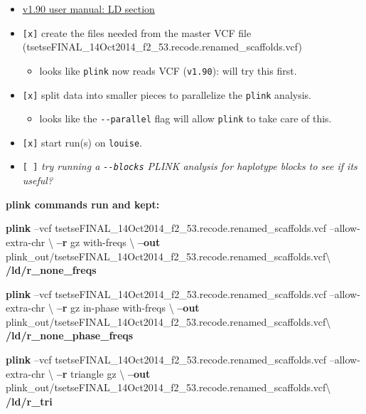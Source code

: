\documentclass[letterpaper]{scrartcl}
\newenvironment{Shaded}{}{}
\newcommand{\KeywordTok}[1]{\textcolor[rgb]{0.00,0.44,0.13}{\textbf{{#1}}}}
\newcommand{\NormalTok}[1]{{#1}}
\begin{document}
\begin{itemize}
\itemsep1pt\parskip0pt
\item
  \href{https://www.cog-genomics.org/plink2/ld}{v1.90 user manual: LD
  section}
\item
  \texttt{{[}x{]}} create the files needed from the master VCF file
  (tsetseFINAL\_14Oct2014\_f2\_53.recode.renamed\_scaffolds.vcf)

  \begin{itemize}
  \itemsep1pt\parskip0pt
  \item
    looks like \texttt{plink} now reads VCF (\texttt{v1.90}): will try
    this first.
  \end{itemize}
\item
  \texttt{{[}x{]}} split data into smaller pieces to parallelize the
  \texttt{plink} analysis.

  \begin{itemize}
  \itemsep1pt\parskip0pt
  \item
    looks like the \texttt{-\/-parallel} flag will allow \texttt{plink}
    to take care of this.
  \end{itemize}
\item
  \texttt{{[}x{]}} start run(s) on \texttt{louise}.
\item
  \texttt{{[} {]}} \emph{try running a \texttt{-\/-blocks} PLINK
  analysis for haplotype blocks to see if its useful?}
\end{itemize}

\textbf{plink commands run and kept:}

\begin{Shaded}
\begin{Highlighting}[]
\KeywordTok{plink} \NormalTok{--vcf tsetseFINAL_14Oct2014_f2_53.recode.renamed_scaffolds.vcf --allow-extra-chr \textbackslash{}}
    \KeywordTok{--r} \NormalTok{gz with-freqs  \textbackslash{}}
    \KeywordTok{--out} \NormalTok{plink_out/tsetseFINAL_14Oct2014_f2_53.recode.renamed_scaffolds.vcf\textbackslash{}}
    \KeywordTok{/ld/r_none_freqs}

\KeywordTok{plink} \NormalTok{--vcf tsetseFINAL_14Oct2014_f2_53.recode.renamed_scaffolds.vcf --allow-extra-chr \textbackslash{}}
    \KeywordTok{--r} \NormalTok{gz in-phase with-freqs  \textbackslash{}}
    \KeywordTok{--out} \NormalTok{plink_out/tsetseFINAL_14Oct2014_f2_53.recode.renamed_scaffolds.vcf\textbackslash{}}
    \KeywordTok{/ld/r_none_phase_freqs}

\KeywordTok{plink} \NormalTok{--vcf tsetseFINAL_14Oct2014_f2_53.recode.renamed_scaffolds.vcf --allow-extra-chr \textbackslash{}}
    \KeywordTok{--r} \NormalTok{triangle gz  \textbackslash{}}
    \KeywordTok{--out} \NormalTok{plink_out/tsetseFINAL_14Oct2014_f2_53.recode.renamed_scaffolds.vcf\textbackslash{}}
    \KeywordTok{/ld/r_tri}
\end{Highlighting}
\end{Shaded}
\end{document}
